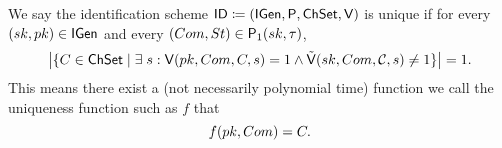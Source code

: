 \begin{definition}[$\uniqueness$]
We say the identification scheme $\mathsf{ID} \coloneqq(\mathsf{IGen}, \mathsf{P} ,\mathsf{ChSet}, \mathsf{V})$ is
unique if for every $(sk,pk)\in\mathsf{IGen}$ and every $(Com,St)\in\mathsf{P}_1(sk,\tau)$,
$$\big{|}\{\c \in \ChSet \mid \exists \s : \IDV(\pk,\com,\c,\s) = 1 \land \IDAltV(\sk, \com, \C,  \s) \neq 1 \}\big{|} = 1.$$
This means there exist a (not necessarily polynomial time) function we call the uniqueness function such as $f$ that
$$f(pk,Com) = C.$$
\end{definition}

